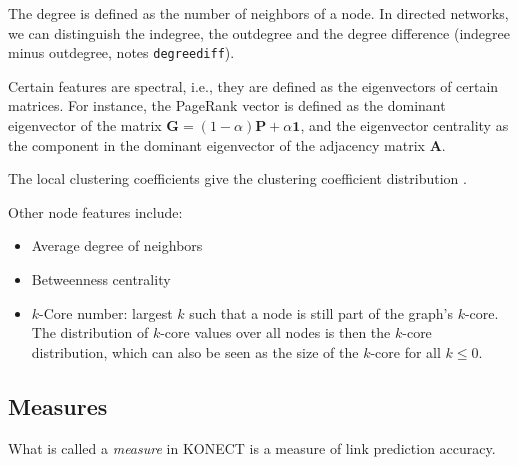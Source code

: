 \documentclass{article}
\begin{document}
The degree is defined as the number 
of neighbors of a node.  In directed networks, we can distinguish the
indegree, the outdegree and the degree difference (indegree minus
outdegree, notes \texttt{degreediff}). 

Certain features are spectral, i.e., they are defined as the
eigenvectors of certain matrices.  For instance, the PageRank vector
 is defined as the dominant eigenvector of
the matrix $\mathbf G = (1-\alpha) \mathbf P + \alpha\mathbf 1$, and the
eigenvector centrality as the component in the dominant eigenvector of
the adjacency matrix $\mathbf A$. 

The local clustering coefficients give the clustering coefficient
distribution  \citep{b865}. 

Other node features include:
\begin{itemize}
\item Average degree of neighbors
\item Betweenness centrality
\item $k$-Core number:  largest $k$ such that a node is still part of
  the graph's $k$-core.  The distribution of $k$-core values over all
  nodes is then the $k$-core distribution, which can also be seen as the
  size of the $k$-core for all $k \leq 0$. 
\end{itemize}

\subsection{Measures}
What is called a \emph{measure} in KONECT is a measure of link
prediction accuracy. 
\end{document}

